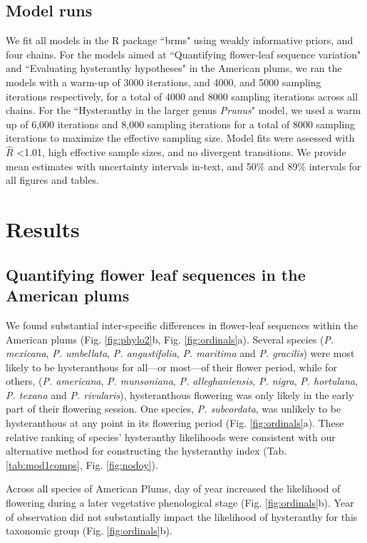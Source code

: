 \documentclass{article}[12pt]
\begin{document}
{\subsection*{Model runs} 
We fit all models in the R package ``brms" \citep{Burkner2018} using weakly informative priors, and four chains.
For the models aimed at ``Quantifying flower-leaf sequence variation" and ``Evaluating hysteranthy hypotheses" in the American plums, we ran the models with a warm-up of 3000 iterations, and 4000, and 5000 sampling iterations respectively, for a total of 4000 and 8000 sampling iterations across all chains. For the ``Hysteranthy in the larger genus \textit{Prunus}" model, we used a warm up of 6,000 iterations and 8,000 sampling iterations for a total of 8000 sampling iterations to maximize the effective sampling size. Model fits were assessed with  $\hat{R}$ <1.01, high effective sample sizes, and no divergent transitions. We provide mean estimates with  uncertainty intervals in-text, and 50\% and 89\% intervals for all figures and tables.

\section*{Results}
\subsection*{Quantifying flower leaf sequences in the American plums}
We found substantial inter-specific differences in flower-leaf sequences within the American plums (Fig. \ref{fig:phylo2}b, Fig. \ref{fig:ordinals}a). Several species (\emph{P. mexicana}, \textit{P. umbellata}, \textit{P. angustifolia}, \textit{P. maritima} and \textit{P. gracilis}) were most likely to be hysteranthous for all---or most---of their flower period, while for others, (\textit{P. americana}, \textit{P. munsoniana}, \textit{P. alleghaniensis}, \textit{P. nigra}, \textit{P. hortulana}, \textit{P. texana} and \textit{P. rivularis}), hysteranthous flowering was only likely in the early part of their flowering session. One species, \emph{P. subcordata}, was unlikely to be hysteranthous at any point in its flowering period (Fig. \ref{fig:ordinals}a). These relative ranking of species' hysteranthy likelihoods were consistent with our alternative method for constructing the hysteranthy index (Tab. \ref{tab:mod1comps}, Fig. \ref{fig:nodoy}).


Across all species of American Plums, day of year increased the likelihood of flowering during a later vegetative phenological stage (Fig. \ref{fig:ordinals}b). Year of observation did not substantially impact the likelihood of hysteranthy for this taxonomic group (Fig. \ref{fig:ordinals}b).

}
\end{document}
